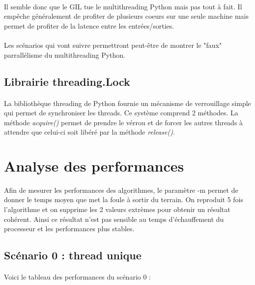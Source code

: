 \documentclass[12pt,oneside,a4paper]{article}
\begin{document}
\paragraph{}
Il semble donc que le GIL tue le multithreading Python mais pas tout à fait. Il empêche généralement de profiter
de plusieurs coeurs sur une seule machine mais permet de profiter de la latence entre les entrées/sorties.
\paragraph{}
Les scénarios qui vont suivre permettront peut-être de montrer le "faux" parrallélisme du multithreading Python.

\subsection{Librairie threading.Lock}
\paragraph{}
La bibliothèque threading de Python fournie un mécanisme de verrouillage
simple qui permet de synchroniser les threads. Ce système
comprend 2 méthodes. La méthode \textit{acquire()} permet de prendre le vérrou et de 
forcer les autres threads à attendre que celui-ci soit libéré par la méthode 
\textit{release()}.

\section{Analyse des performances}
\paragraph{}
Afin de mesurer les performances des algorithmes, le paramètre -m permet de 
donner le temps moyen que met la foule à sortir du terrain. On reproduit 5 fois
l'algorithme et on supprime les 2 valeurs extrèmes pour obtenir un résultat cohérent.
Ainsi ce résultat n'est pas sensible au temps d'échauffement du processeur et
les performances plus stables.

\subsection{Scénario 0 : thread unique}
\paragraph{}
Voici le tableau des performances du scénario 0 :
\end{document}

